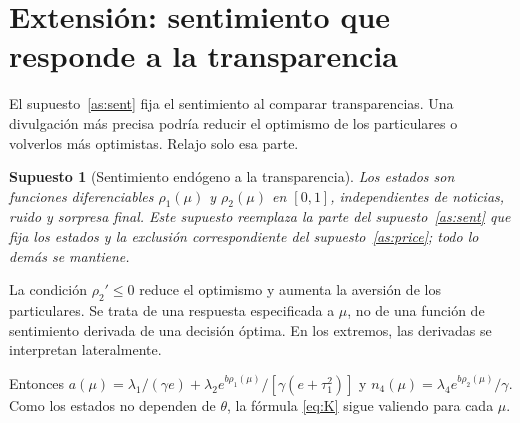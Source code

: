 \documentclass[11pt]{article}
\newtheorem{assumption}{Supuesto}
\begin{document}
\section{Extensión: sentimiento que responde a la transparencia}
El supuesto~\ref{as:sent} fija el sentimiento al comparar transparencias.
Una divulgación más precisa podría reducir el optimismo de los particulares o volverlos
más optimistas. Relajo solo esa parte.

\begin{assumption}[Sentimiento endógeno a la transparencia]\label{as:endo}
Los estados son funciones diferenciables $\rho_1(\mu)$ y $\rho_2(\mu)$ en
$[0,1]$, independientes de noticias, ruido y sorpresa final. Este supuesto
reemplaza la parte del supuesto~\ref{as:sent} que fija los estados y la
exclusión correspondiente del supuesto~\ref{as:price}; todo lo demás se
mantiene.
\end{assumption}
La condición $\rho_2'\leq0$ reduce el optimismo y aumenta la aversión de los
particulares. Se trata de una respuesta especificada a $\mu$, no de una
función de sentimiento derivada de una decisión óptima. En los extremos,
las derivadas se interpretan lateralmente.

Entonces $a(\mu)=\lambda_1/(\gamma e)+\lambda_2e^{b\rho_1(\mu)}/[\gamma(e+\tau_1^2)]$
y $n_4(\mu)=\lambda_4e^{b\rho_2(\mu)}/\gamma$. Como los estados no dependen
de $\theta$, la fórmula \eqref{eq:K} sigue valiendo para cada $\mu$.
\end{document}
